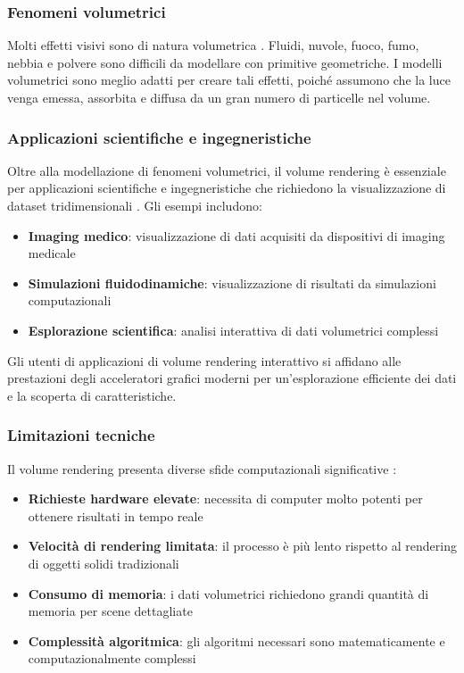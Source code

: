\subsubsection{Fenomeni volumetrici}

Molti effetti visivi sono di natura volumetrica \cite{ikits2004volume}. Fluidi, nuvole, fuoco, fumo, nebbia e polvere sono difficili da modellare con primitive geometriche. I modelli volumetrici sono meglio adatti per creare tali effetti, poiché assumono che la luce venga emessa, assorbita e diffusa da un gran numero di particelle nel volume.

\subsubsection{Applicazioni scientifiche e ingegneristiche}

Oltre alla modellazione di fenomeni volumetrici, il volume rendering è essenziale per applicazioni scientifiche e ingegneristiche che richiedono la visualizzazione di dataset tridimensionali \cite{ikits2004volume}. Gli esempi includono:

\begin{itemize}
    \item \textbf{Imaging medico}: visualizzazione di dati acquisiti da dispositivi di imaging medicale
    \item \textbf{Simulazioni fluidodinamiche}: visualizzazione di risultati da simulazioni computazionali
    \item \textbf{Esplorazione scientifica}: analisi interattiva di dati volumetrici complessi
\end{itemize}

Gli utenti di applicazioni di volume rendering interattivo si affidano alle prestazioni degli acceleratori grafici moderni per un'esplorazione efficiente dei dati e la scoperta di caratteristiche.

\subsubsection{Limitazioni tecniche}

Il volume rendering presenta diverse sfide computazionali significative \cite{ikits2004volume}:

\begin{itemize}
    \item \textbf{Richieste hardware elevate}: necessita di computer molto potenti per ottenere risultati in tempo reale
    \item \textbf{Velocità di rendering limitata}: il processo è più lento rispetto al rendering di oggetti solidi tradizionali
    \item \textbf{Consumo di memoria}: i dati volumetrici richiedono grandi quantità di memoria per scene dettagliate
    \item \textbf{Complessità algoritmica}: gli algoritmi necessari sono matematicamente e computazionalmente complessi
\end{itemize}


